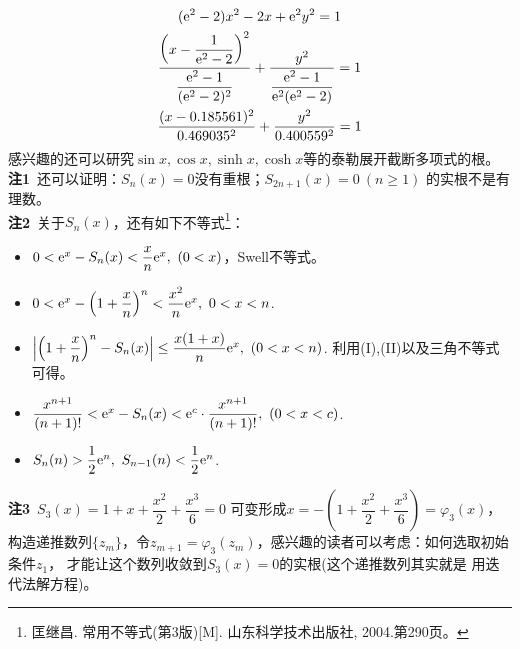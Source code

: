 \begin{enumerate}[label={【\textbf{例\thechapter.\arabic*}】},
 leftmargin=\inteval{\myenumleftmargin}pt,
 itemsep=\inteval{\myenumitempsep}pt,
 itemindent=\inteval{\myenumitemindent}pt]
\begin{gather*}
    (\mathrm{e}^2-2)x^2-2x+\mathrm{e}^2y^2=1 \\
    \dfrac{\left(x-\dfrac{1}{\mathrm{e}^2-2}\right)^2}{\dfrac{\mathrm{e}^2-1}{(\mathrm{e}^2-2)^2}}+
    \dfrac{y^2}{\dfrac{\mathrm{e}^2-1}{\mathrm{e}^2(\mathrm{e}^2-2)}}=1 \\
    \dfrac{(x-0.185561)^2}{0.469035^2}+\dfrac{y^2}{0.400559^2}=1
\end{gather*}
感兴趣的还可以研究$ \sin x,\cos x,\sinh x,\cosh x $等的泰勒展开截断多项式的根。\\
\textbf{注1}\ 还可以证明：$ S_n(x)=0 $没有重根；$ S_{2n+1}(x)=0\ (n\geq 1) $
的实根不是有理数。\\
\textbf{注2}\ 关于$ S_n(x) $，还有如下不等式\footnote{匡继昌. 
    常用不等式(第3版)[M]. 山东科学技术出版社, 2004.第290页。}：
\begin{itemize}
\item $ 0<\e^x-S_n(x)<\dfrac{x}{n}\e^x,\ (0<x) $，Swell不等式。
\item $ 0<\mathrm{e}^x-\left(1+\dfrac{x}{n}\right)^n<\dfrac{x^2}{n}\mathrm{e}^x,
\ 0<x<n $.
\item $ \left|\left(1+\dfrac{x}{n}\right)^n-S_n(x)\right|
\leq \dfrac{x(1+x)}{n}\mathrm{e}^x,\ (0<x<n) $. 利用(I),(II)以及三角不等式可得。
\item $ \dfrac{x^{n+1}}{(n+1)!}<\mathrm{e}^x-S_n(x)<\mathrm{e}^c \cdot \dfrac{x^{n+1}}
{(n+1)!},\ (0<x<c) $.
\item $ S_n(n)>\dfrac{1}{2}\e^n,\ S_{n-1}(n)<\dfrac{1}{2}\e^n $.
\end{itemize}
\textbf{注3}\ $ S_3(x)=1+x+\dfrac{x^2}{2}+\dfrac{x^3}{6}=0 $
可变形成$ x=-\left(1+\dfrac{x^2}{2}+\dfrac{x^3}{6}\right)=
\varphi_3(x) $，构造递推数列$ \{z_m\} $，令$ z_{m+1}=
\varphi_3(z_m) $，感兴趣的读者可以考虑：如何选取初始条件$ z_1 $，
才能让这个数列收敛到$ S_3(x)=0 $的实根(这个递推数列其实就是
用迭代法解方程)。


\end{enumerate}
